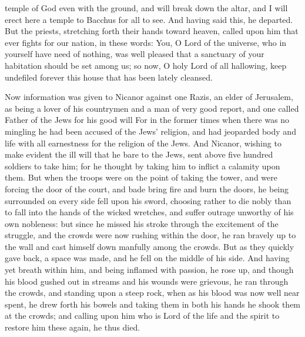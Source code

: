 { temple of God even with the ground, and will break down the altar, and I will erect here a temple to
 Bacchus for all to see.
And having said this, he departed. But the priests, stretching forth their hands toward heaven, called upon him that ever fights for our nation, in these words:
You,
 O Lord of the universe, who in yourself have need of nothing, was well pleased that a sanctuary of your
 habitation should be set among us;
so now, O holy Lord of all hallowing, keep undefiled forever this house that has been lately cleansed.
\par }{\PP {}Now information was given to Nicanor against one Razis, an elder of Jerusalem,
 as being a lover of his countrymen and a man of very good report, and one called Father of the Jews for his good will
{}
For in the former times when there was no mingling
{} he had been accused of
{} the Jews’ religion, and had jeoparded body and life with all earnestness for the religion of the Jews.
And Nicanor, wishing to make evident the ill will that he bare to the Jews, sent above five hundred soldiers to take him;
for he thought by taking him to inflict a calamity upon them.
But when the
 troops were on the point of taking the tower, and were forcing the door of the court, and bade bring fire and burn the doors, he being surrounded on every side fell upon his sword,
choosing rather to die nobly than to fall into the hands of the wicked wretches, and suffer outrage unworthy of his own nobleness:
but since he missed his stroke through the excitement of the struggle, and the crowds were now rushing within the door, he ran bravely up to the wall and cast himself down manfully among the crowds.
But as they quickly gave back, a space was made, and he fell on the middle of
 his side.
And having yet breath within him, and being inflamed with passion, he rose up, and though his blood gushed out in streams and his wounds were grievous, he ran through the crowds, and standing upon a steep rock,
when as his blood was now well near spent, he drew forth his bowels
{} and taking them in both his hands he shook them at the crowds; and calling upon him who is Lord of
 the life and the
 spirit to restore him
 these again, he thus died.

}
